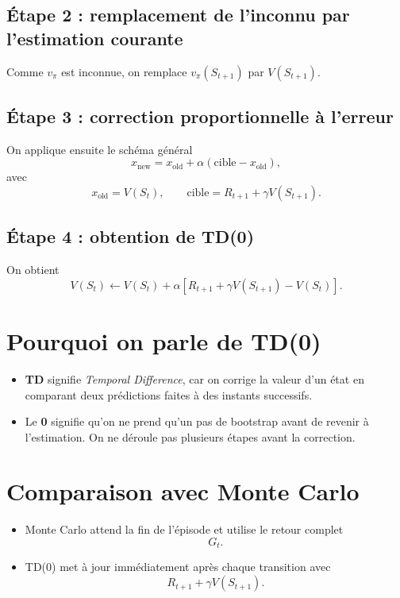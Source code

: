 \documentclass[11pt,a4paper]{article}
\begin{document}
\subsection{Étape 2 : remplacement de l'inconnu par l'estimation courante}

Comme $v_{\pi}$ est inconnue, on remplace $v_{\pi}(S_{t+1})$ par $V(S_{t+1})$.

\subsection{Étape 3 : correction proportionnelle à l'erreur}

On applique ensuite le schéma général
\[
x_{\text{new}} = x_{\text{old}}+\alpha(\text{cible}-x_{\text{old}}),
\]
avec
\[
x_{\text{old}}=V(S_t), \qquad \text{cible}=R_{t+1}+\gamma V(S_{t+1}).
\]

\subsection{Étape 4 : obtention de TD(0)}

On obtient
\[
V(S_t)\leftarrow V(S_t)+\alpha\left[R_{t+1}+\gamma V(S_{t+1})-V(S_t)\right].
\]

\section{Pourquoi on parle de TD(0)}

\begin{itemize}[leftmargin=1.6em]
    \item \textbf{TD} signifie \emph{Temporal Difference}, car on corrige la valeur d'un état en comparant deux prédictions faites à des instants successifs.
    \item Le \textbf{0} signifie qu'on ne prend qu'un pas de bootstrap avant de revenir à l'estimation. On ne déroule pas plusieurs étapes avant la correction.
\end{itemize}

\section{Comparaison avec Monte Carlo}

\begin{itemize}[leftmargin=1.6em]
    \item Monte Carlo attend la fin de l'épisode et utilise le retour complet
    \[
    G_t.
    \]
    \item TD(0) met à jour immédiatement après chaque transition avec
    \[
    R_{t+1}+\gamma V(S_{t+1}).
    \]
\end{itemize}
\end{document}
